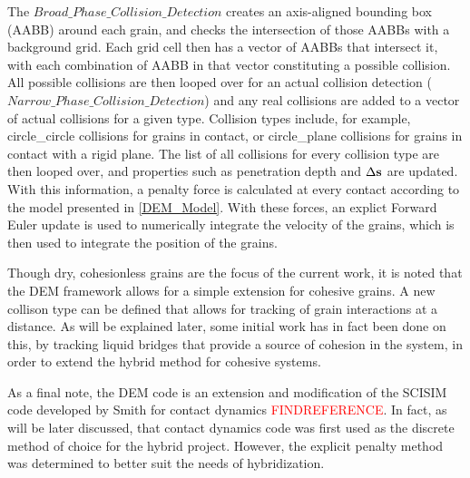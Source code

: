 The $Broad\_Phase\_Collision\_Detection$ creates an axis-aligned bounding box (AABB) around each grain, and checks the intersection of those AABBs with a background grid. Each grid cell then has a vector of AABBs that intersect it, with each combination of AABB in that vector constituting a possible collision. All possible collisions are then looped over for an actual collision detection ($Narrow\_Phase\_Collision\_Detection$) and any real collisions are added to a vector of actual collisions for a given type. Collision types include, for example, circle\_circle collisions for grains in contact, or circle\_plane collisions for grains in contact with a rigid plane. The list of all collisions for every collision type are then looped over, and properties such as penetration depth and $\Delta\bold{s}$ are updated. With this information, a penalty force is calculated at every contact according to the model presented in \ref{DEM_Model}. With these forces, an explict Forward Euler update is used to numerically integrate the velocity of the grains, which is then used to integrate the position of the grains.

Though dry, cohesionless grains are the focus of the current work, it is noted that the DEM framework allows for a simple extension for cohesive grains. A new collison type can be defined that allows for tracking of grain interactions at a distance. As will be explained later, some initial work has in fact been done on this, by tracking liquid bridges that provide a source of cohesion in the system, in order to extend the hybrid method for cohesive systems.

As a final note, the DEM code is an extension and modification of the SCISIM code developed by Smith for contact dynamics \textcolor{red}{FINDREFERENCE}. In fact, as will be later discussed, that contact dynamics code was first used as the discrete method of choice for the hybrid project. However, the explicit penalty method was determined to better suit the needs of hybridization.